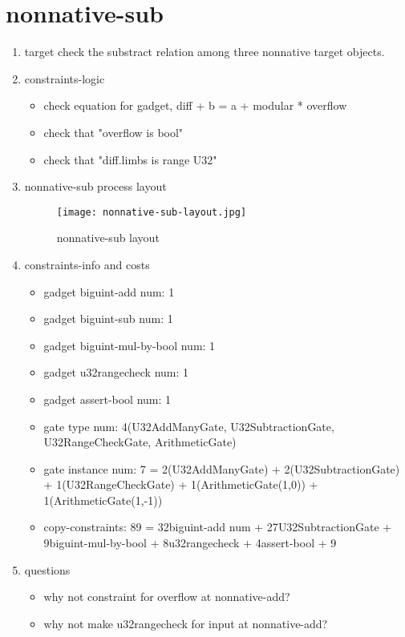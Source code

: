 \section{nonnative-sub}
\label{nonnative-sub}

\begin{enumerate}
    \item target
        check the substract relation among three nonnative target objects.
    \item constraints-logic
        \begin{itemize}
            \item check equation for gadget,  diff + b = a + modular * overflow
            \item check that "overflow is bool"
            \item check that "diff.limbs is range U32"
        \end{itemize}
    \item nonnative-sub process layout
        \begin{figure}[!ht]
            \centering
            \texttt{[image: nonnative-sub-layout.jpg]}
            \caption{nonnative-sub layout}
            \label{fig:nonnative-sub-layout}
        \end{figure}
    
    \item constraints-info and costs
        \begin{itemize}
            \item gadget biguint-add num: 1
            \item gadget biguint-sub num: 1
            \item gadget biguint-mul-by-bool num: 1
            \item gadget u32rangecheck num: 1
            \item gadget assert-bool num: 1
            \item gate type num: 4(U32AddManyGate, U32SubtractionGate, U32RangeCheckGate, ArithmeticGate)
            \item gate instance num: 7 = 2(U32AddManyGate) + 2(U32SubtractionGate) + 1(U32RangeCheckGate) + 1(ArithmeticGate(1,0)) + 1(ArithmeticGate(1,-1))
            \item copy-constraints: 89 = 32{biguint-add num} + 27{U32SubtractionGate} + 9{biguint-mul-by-bool} + 8{u32rangecheck} + 4{assert-bool} + 9
        \end{itemize}

    \item questions
        \begin{itemize}
            \item why not constraint for overflow at nonnative-add?
            \item why not make u32rangecheck for input at nonnative-add?
        \end{itemize}

\end{enumerate}